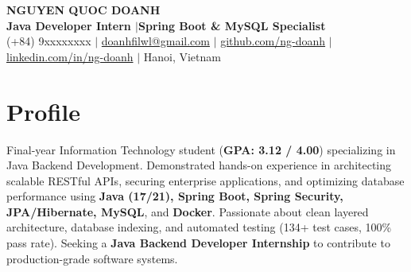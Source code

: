﻿\documentclass[10pt,a4paper]{article}
\begin{document}
\begin{center}
    {\LARGE \textbf{NGUYEN QUOC DOANH}} \\[3pt]
    {\normalsize \textbf{Java Developer Intern \enspace$|$\enspace Spring Boot \& MySQL Specialist}} \\[3pt]
    \small
    (+84) 9xxxxxxxx \enspace$|$\enspace 
    \href{mailto:doanhfilwl@gmail.com}{doanhfilwl@gmail.com} \enspace$|$\enspace 
    \href{https://github.com/ng-doanh}{github.com/ng-doanh} \enspace$|$\enspace 
    \href{https://linkedin.com/in/ng-doanh}{linkedin.com/in/ng-doanh} \enspace$|$\enspace 
    Hanoi, Vietnam
\end{center}

\vspace{-4pt}

\section{Profile}
Final-year Information Technology student (\textbf{GPA: 3.12 / 4.00}) specializing in Java Backend Development. Demonstrated hands-on experience in architecting scalable RESTful APIs, securing enterprise applications, and optimizing database performance using \textbf{Java (17/21), Spring Boot, Spring Security, JPA/Hibernate, MySQL}, and \textbf{Docker}. Passionate about clean layered architecture, database indexing, and automated testing (134+ test cases, 100\% pass rate). Seeking a \textbf{Java Backend Developer Internship} to contribute to production-grade software systems.

\end{document}
